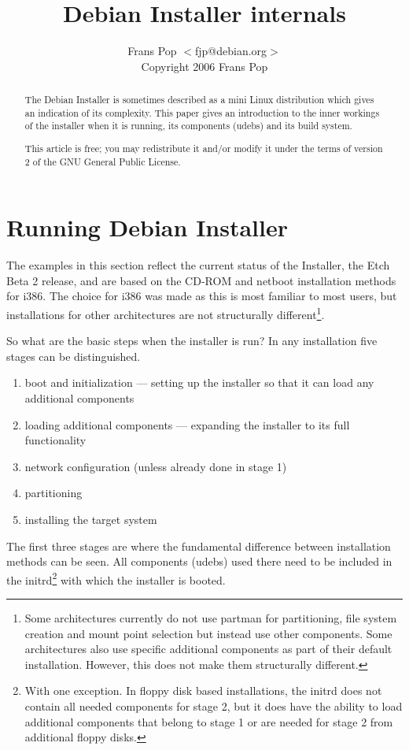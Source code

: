 \documentclass[a4paper,10pt]{article}
\title{Debian Installer internals}
\author{Frans Pop $<$fjp@debian.org$>$ \\
Copyright 2006 Frans Pop}
\begin{document}
\maketitle

\tableofcontents

\begin{abstract}
The Debian Installer is sometimes described as a mini Linux distribution which gives an indication of its complexity. This paper gives an introduction to the inner workings of the installer when it is running, its components (udebs) and its build system.

This article is free; you may redistribute it and/or modify it under the terms of version 2 of the GNU General Public License. 
\end{abstract}

\newpage
\section{Running Debian Installer}

The examples in this section reflect the current status of the Installer, the Etch Beta 2 release, and are based on the CD-ROM and netboot installation methods for i386. The choice for i386 was made as this is most familiar to most users, but installations for other architectures are not structurally different\footnote{Some architectures currently do not use partman for partitioning, file system creation and mount point selection but instead use other components. Some architectures also use specific additional components as part of their default installation. However, this does not make them structurally different.}. 

So what are the basic steps when the installer is run? In any installation five stages can be distinguished. 

\begin{enumerate}
\item boot and initialization — setting up the installer so that it can load any additional components
\item loading additional components — expanding the installer to its full functionality
\item network configuration (unless already done in stage 1)
\item partitioning
\item installing the target system
\end{enumerate}

The first three stages are where the fundamental difference between installation methods can be seen. All components (udebs) used there need to be included in the initrd\footnote{With one exception. In floppy disk based installations, the initrd does not contain all needed components for stage 2, but it does have the ability to load additional components that belong to stage 1 or are needed for stage 2 from additional floppy disks.} with which the installer is booted. 
\end{document}
